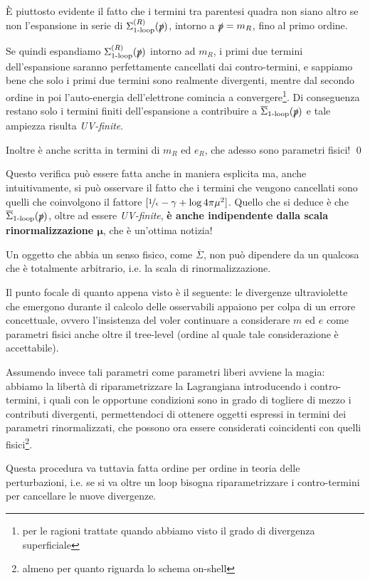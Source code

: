 \documentclass[../main.tex]{subfiles}
\begin{document}
 È piuttosto evidente il fatto che i termini tra parentesi quadra non siano altro se non l'espansione in serie di $\Sigma_\text{1-loop}^{(R)}(\slashed p)$, intorno a $\slashed p = m_R$, fino al primo ordine. 
 
 Se quindi espandiamo $\Sigma_\text{1-loop}^{(R)}(\slashed p)$ intorno ad $m_R$, i primi due termini dell'espansione saranno perfettamente cancellati dai contro-termini, e sappiamo bene che solo i primi due termini sono realmente divergenti, mentre dal secondo ordine in poi l'auto-energia dell'elettrone comincia a convergere\footnote{per le ragioni trattate quando abbiamo visto il grado di divergenza superficiale}. 
Di conseguenza restano solo i termini finiti dell'espansione a contribuire a $\overline\Sigma_\text{1-loop}(\slashed p)$ e tale ampiezza risulta \textit{UV-finite}.

Inoltre è anche scritta in termini di $m_R$ ed $e_R$, che adesso sono parametri fisici! \qed

\begin{nota}
    Questo verifica può essere fatta anche in maniera esplicita ma, anche intuitivamente, si può osservare il fatto che i termini che vengono cancellati sono quelli che coinvolgono il fattore \([\nicefrac{1}{\epsilon} - \mathbb\gamma +\log{4\pi\mu^2}]\). Quello che si deduce è che \(\overline\Sigma_\text{1-loop}(\slashed p)\), oltre ad essere \textit{UV-finite}, \textbf{è anche indipendente dalla scala rinormalizzazione $\mathbf\mu$}, che è un'ottima notizia!

    Un oggetto che abbia un senso fisico, come $\overline\Sigma$, non può dipendere da un qualcosa che è totalmente arbitrario, i.e. la scala di rinormalizzazione.
    \label{note:mu_independence_importance}
\end{nota}

\begin{nota}
    Il punto focale di quanto appena visto è il seguente: le divergenze ultraviolette che emergono durante il calcolo delle osservabili appaiono per colpa di un errore concettuale, ovvero l'insistenza del voler continuare a considerare $m$ ed $e$ come parametri fisici anche oltre il tree-level (ordine al quale tale considerazione è accettabile). 
    
    Assumendo invece tali parametri come parametri liberi avviene la magia: abbiamo la libertà di riparametrizzare la Lagrangiana introducendo i contro-termini, i quali con le opportune condizioni sono in grado di togliere di mezzo i contributi divergenti, permettendoci di ottenere oggetti espressi in termini dei parametri rinormalizzati, che possono ora essere considerati coincidenti con quelli fisici\footnote{almeno per quanto riguarda lo schema on-shell}. 

    Questa procedura va tuttavia fatta ordine per ordine in teoria delle perturbazioni, i.e. se si va oltre un loop bisogna riparametrizzare i contro-termini per cancellare le nuove divergenze.
    \label{note:essence_of_ren_procedure}
\end{nota}
\end{document}
